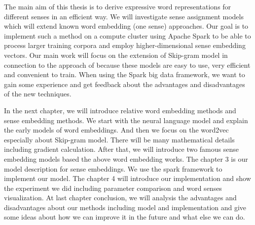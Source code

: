 The main aim of this thesis is to derive expressive word representations for different senses in an efficient way. We will investigate sense assignment models which will extend known word embedding (one sense) approaches. Our goal is to implement such a method on a compute cluster using Apache Spark to be able to process larger training corpora and employ higher-dimensional sense embedding vectors.
Our main work will focus on the extension of Skip-gram model \citep{MikolovSutskeverEtAl2013} in connection to the approach of \citep{NeelakantanShankarEtAl2015} because these models are easy to use, very efficient and convenient to train.  When using the Spark big data framework, we want to gain some experience and get  feedback about the advantages and disadvantages of the new techniques.

In the next chapter, we will introduce relative word embedding methods and sense embedding methods. We start with the neural language model and explain the early models of word embeddings. And then we focus on the word2vec \cite{MikolovSutskeverEtAl2013} especially about Skip-gram model. There will be many mathematical details including gradient calculation. After that, we will introduce two famous sense embedding models based the above word embedding works. 
The chapter 3 is our model description for sense embeddings. We use the spark framework to implement our model. The chapter 4 will introduce our implementation and show the experiment we did including parameter comparison and word senses visualization. At last chapter conclusion, we will analysis the advantages and disadvantages about our methods including model and implementation and give some ideas about how we can improve it in the future and what else we can do.

